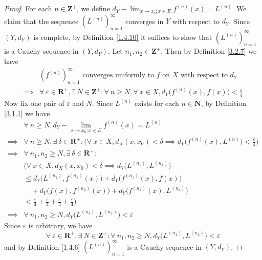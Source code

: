 \begin{proof}
    For each \(n \in \mathbf{Z}^+\), we define \(d_Y - \lim_{x \to x_0 ; x \in E} f^{(n)}(x) = L^{(n)}\).
    We claim that the sequence \((L^{(n)})_{n = 1}^\infty\) converges in \(Y\) with respect to \(d_Y\).
    Since \((Y, d_Y)\) is complete, by Definition \ref{1.4.10} it suffices to show that \((L^{(n)})_{n = 1}^\infty\) is a Cauchy sequence in \((Y, d_Y)\).
    Let \(n_1, n_2 \in \mathbf{Z}^+\).
    Then by Definition \ref{3.2.7} we have
    \begin{align*}
                 & (f^{(n)})_{n = 1}^\infty \text{ converges uniformly to } f \text{ on } X \text{ with respect to } d_Y                                                           \\
        \implies & \forall\ \varepsilon \in \mathbf{R}^+, \exists\ N \in \mathbf{Z}^+ : \forall\ n \geq N, \forall\ x \in X, d_Y\big(f^{(n)}(x), f(x)\big) < \frac{\varepsilon}{4}
    \end{align*}
    Now fix one pair of \(\varepsilon\) and \(N\).
    Since \(L^{(n)}\) exists for each \(n \in \mathbf{N}\), by Definition \ref{3.1.1} we have
    \begin{align*}
                 & \forall\ n \geq N, d_Y - \lim_{x \to x_0 ; x \in E} f^{(n)}(x) = L^{(n)}                                                                                                 \\
        \implies & \forall\ n \geq N, \exists\ \delta \in \mathbf{R}^+ : \Big(\forall\ x \in X, d_X(x, x_0) < \delta \implies d_Y\big(f^{(n)}(x), L^{(n)}\big) < \frac{\varepsilon}{4}\Big) \\
        \implies & \forall\ n_1, n_2 \geq N, \exists\ \delta \in \mathbf{R}^+ :                                                                                                             \\
                 & \Big(\forall\ x \in X, d_X(x, x_0) < \delta \implies d_Y\big(L^{(n_1)}, L^{(n_2)}\big)                                                                                   \\
                 & \leq d_Y\big(L^{(n_1)}, f^{(n_1)}(x)\big) + d_Y\big(f^{(n_1)}(x), f(x)\big)                                                                                              \\
                 & \quad + d_Y\big(f(x), f^{(n_2)}(x)\big) + d_Y\big(f^{(n_2)}(x), L^{(n_2)}\big)                                                                                           \\
                 & < \frac{\varepsilon}{4} + \frac{\varepsilon}{4} + \frac{\varepsilon}{4} + \frac{\varepsilon}{4}\Big)                                                                     \\
        \implies & \forall\ n_1, n_2 \geq N, d_Y\big(L^{(n_1)}, L^{(n_2)}\big) < \varepsilon
    \end{align*}
    Since \(\varepsilon\) is arbitrary, we have
    \[
        \forall\ \varepsilon \in \mathbf{R}^+, \exists\ N \in \mathbf{Z}^+ : \forall\ n_1, n_2 \geq N, d_Y\big(L^{(n_1)}, L^{(n_2)}\big) < \varepsilon
    \]
    and by Definition \ref{1.4.6} \((L^{(n)})_{n = 1}^\infty\) is a Cauchy sequence in \((Y, d_Y)\).


\end{proof}
